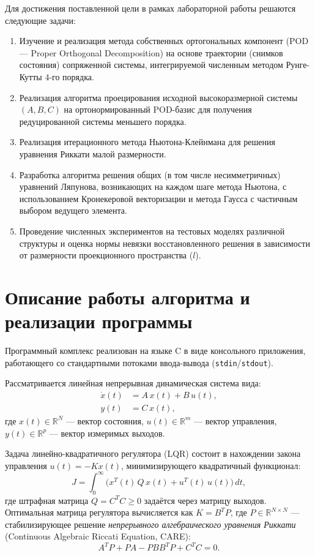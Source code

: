 \documentclass[12pt, a4paper, oneside]{extarticle}
\begin{document}
Для достижения поставленной цели в рамках лабораторной работы решаются следующие задачи:
\begin{enumerate}
    \item Изучение и реализация метода собственных ортогональных компонент (POD — Proper Orthogonal Decomposition) на основе траектории (снимков состояния) сопряженной системы, интегрируемой численным методом Рунге-Кутты 4-го порядка.
    \item Реализация алгоритма проецирования исходной высокоразмерной системы $(A,B,C)$ на ортонормированный POD-базис для получения редуцированной системы меньшего порядка.
    \item Реализация итерационного метода Ньютона-Клейнмана для решения уравнения Риккати малой размерности.
    \item Разработка алгоритма решения общих (в том числе несимметричных) уравнений Ляпунова, возникающих на каждом шаге метода Ньютона, с использованием Кронекеровой векторизации и метода Гаусса с частичным выбором ведущего элемента.
    \item Проведение численных экспериментов на тестовых моделях различной структуры и оценка нормы невязки восстановленного решения в зависимости от размерности проекционного пространства ($l$).
\end{enumerate}

\clearpage
\section{Описание работы алгоритма и реализации программы}

Программный комплекс реализован на языке C в виде консольного приложения,
работающего со стандартными потоками ввода-вывода (\texttt{stdin}/\texttt{stdout}).

Рассматривается линейная непрерывная динамическая система вида:
\begin{align}
    \dot{x}(t) &= A\,x(t) + B\,u(t), \label{eq:state} \\
    y(t)       &= C\,x(t),            \label{eq:output}
\end{align}
где $x(t) \in \mathbb{R}^N$ --- вектор состояния, $u(t) \in \mathbb{R}^m$ ---
вектор управления, $y(t) \in \mathbb{R}^p$ --- вектор измеримых выходов.

Задача линейно-квадратичного регулятора (LQR) состоит в нахождении закона
управления $u(t) = -K x(t)$, минимизирующего квадратичный функционал:
\begin{equation}
    J = \int_0^{\infty} \bigl( x^T(t)\,Q\,x(t) + u^T(t)\,u(t) \bigr)\,dt,
    \label{eq:lqr}
\end{equation}
где штрафная матрица $Q = C^T C \geq 0$ задаётся через матрицу выходов.
Оптимальная матрица регулятора вычисляется как $K = B^T P$, где
$P \in \mathbb{R}^{N \times N}$ --- стабилизирующее решение \textit{непрерывного
алгебраического уравнения Риккати} (Continuous Algebraic Riccati Equation,
CARE):
\begin{equation}
    A^T P + P A - P B B^T P + C^T C = 0.
    \label{eq:riccati_equation}
\end{equation}
\end{document}

